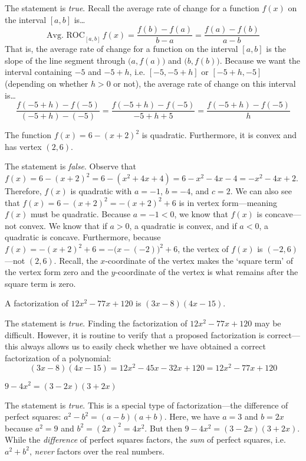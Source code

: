 \documentclass[11pt,letterpaper]{article}
\begin{document}
\sol The statement is \textit{true}. Recall the average rate of change for a function $f(x)$ on the interval $[a, b]$ is\dots
	\[
	\text{Avg. ROC}_{[a,b]}\, f(x)= \dfrac{f(b) - f(a)}{b - a}= \dfrac{f(a) - f(b)}{a - b}
	\]
That is, the average rate of change for a function on the interval $[a, b]$ is the slope of the line segment through $\big(a, f(a) \big)$ and $\big(b, f(b) \big)$. Because we want the interval containing $-5$ and $-5 + h$, i.e. $[-5, -5 + h]$ or $[-5 + h, -5]$ (depending on whether $h > 0$ or not), the average rate of change on this interval is\dots
	\[
	\dfrac{f(-5 + h) - f(-5)}{(-5 + h) - (-5)}= \dfrac{f(-5 + h) - f(-5)}{-5 + h + 5}= \dfrac{f(-5 + h) - f(-5)}{h}
	\] \pvspace{1cm}



 The function $f(x)= 6 - (x + 2)^2$ is quadratic. Furthermore, it is convex and has vertex $(2, 6)$. \pspace

\sol The statement is \textit{false}. Observe that $f(x)= 6 - (x + 2)^2= 6 - (x^2 + 4x + 4)= 6 - x^2 - 4x - 4= -x^2 - 4x + 2$. Therefore, $f(x)$ is quadratic with $a= -1$, $b= -4$, and $c= 2$. We can also see that $f(x)= 6 - (x + 2)^2= -(x + 2)^2 + 6$ is in vertex form---meaning $f(x)$ must be quadratic. Because $a= -1 < 0$, we know that $f(x)$ is concave---not convex. We know that if $a > 0$, a quadratic is convex, and if $a < 0$, a quadratic is concave. Furthermore, because $f(x)= -(x + 2)^2 + 6= -\big(x - (-2) \big)^2 + 6$, the vertex of $f(x)$ is $(-2, 6)$---not $(2, 6)$. Recall, the $x$-coordinate of the vertex makes the `square term' of the vertex form zero and the $y$-coordinate of the vertex is what remains after the square term is zero. \pvspace{1.3cm}



 A factorization of $12x^2 - 77x + 120$ is $(3x - 8 )(4x - 15)$. \pspace

\sol The statement is \textit{true}. Finding the factorization of $12x^2 - 77x + 120$ may be difficult. However, it is routine to verify that a proposed factorization is correct---this always allows us to easily check whether we have obtained a correct factorization of a polynomial:
	\[
	(3x - 8 )(4x - 15)= 12x^2 - 45x - 32x + 120= 12x^2 - 77x + 120
	\] \pvspace{1.3cm}



 $9 - 4x^2= (3 - 2x)(3 + 2x)$ \pspace

\sol The statement is \textit{true}. This is a special type of factorization---the difference of perfect squares: $a^2 - b^2= (a - b)(a + b)$. Here, we have $a= 3$ and $b= 2x$ because $a^2= 9$ and $b^2= (2x)^2= 4x^2$. But then $9 - 4x^2= (3 - 2x)(3 + 2x)$. While the \textit{difference} of perfect squares factors, the \textit{sum} of perfect squares, i.e. $a^2 + b^2$, \textit{never} factors over the real numbers. 
\end{document}
